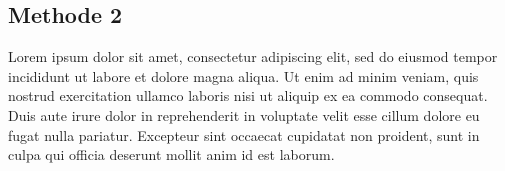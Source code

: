\subsection{Methode 2}
\label{sec:datenauswertung}

Lorem ipsum dolor sit amet, consectetur adipiscing elit, sed do eiusmod tempor
incididunt ut labore et dolore magna aliqua. Ut enim ad minim veniam, quis
nostrud exercitation ullamco laboris nisi ut aliquip ex ea commodo consequat.\autocite[Vgl.][S.
55]{muster:kapitel:2021} Duis aute irure dolor in reprehenderit in voluptate velit
esse cillum dolore eu fugat nulla pariatur. Excepteur sint occaecat cupidatat
non proident, sunt in culpa qui officia deserunt mollit anim id est laborum.

\clearpage